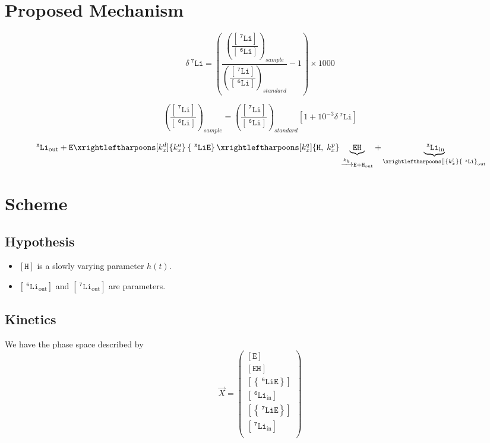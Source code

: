 \documentclass[aps,onecolumn,12pt]{revtex4}
\newcommand{\mychem}[1]{\mathtt{#1}}
\newcommand{\myconc}[1]{\left\lbrack{#1}\right\rbrack}
\newcommand{\spLi}[1]{{~^{\mychem{#1}}\mychem{Li}}}
\newcommand{\Li}[1]{\myconc{\spLi{#1}}}
\newcommand{\spEout}{\mychem{E}}
\newcommand{\Eout}{\myconc{\spEout}}
\newcommand{\spLiE}[1]{\left\lbrace\spLi{#1}\spEout\right\rbrace}
\newcommand{\LiE}[1]{\myconc{\spLiE{#1}}}
\newcommand{\spLiIn}[1]{{\spLi{#1}}_{\mathrm{in}}}
\newcommand{\LiIn}[1]{\myconc{\spLiIn{#1}}}
\newcommand{\spLiOut}[1]{{\spLi{#1}}_{\mathrm{out}}}
\newcommand{\LiOut}[1]{\myconc{\spLiOut{#1}}}
\newcommand{\spEHin}{\mychem{EH}}
\newcommand{\EHin}{\myconc{\spEHin}}
\newcommand{\spproton}{\mychem{H}}
\newcommand{\proton}{\myconc{\spproton}}
\newcommand{\deltaLi}{ {\delta\!\!\!\spLi{7}} }
\begin{document}
\section{Proposed Mechanism}
$$
	\deltaLi = \left(
		\dfrac{\left(\dfrac{\Li{7}}{\Li{6}}\right)_{sample}}
		{\left(\dfrac{\Li{7}}{\Li{6}}\right)_{standard}}
		 -1 
	\right) \times 1000
$$

$$
	\left(\dfrac{\Li{7}}{\Li{6}}\right)_{sample} = \left(\dfrac{\Li{7}}{\Li{6}}\right)_{standard} \left[1+10^{-3}\deltaLi\right]
$$



\begin{equation}
	 \spLiOut{x} +  \spEout  
	 \xrightleftharpoons[k_x^d]{k_x^a} 
	 \spLiE{x}
	  \xrightleftharpoons[k_x^q]{\mychem{H},\;k_x^p} \underbrace{\spEHin}_{\xrightarrow[]{k_h} \mychem{E} + \mychem{H}_{\mathrm{out}}} + \underbrace{\spLiIn{x}}_{\xrightleftharpoons[]{k_x^l} \spLiOut{x}}
\end{equation}

\section{Scheme}

\subsection{Hypothesis}
\begin{itemize}
\item $\proton$ is a slowly varying parameter $h(t)$.
\item $\LiOut{6}$ and  $\LiOut{7}$ are parameters.
\end{itemize}

\subsection{Kinetics}
We have the phase space described by
\begin{equation}
 \vec{X} = 
        \begin{pmatrix}
        \Eout\\
        \EHin\\
        \LiE{6}\\
        \LiIn{6}\\
        \LiE{7}\\
        \LiIn{7}\\
        \end{pmatrix}
\end{equation}
\end{document}
